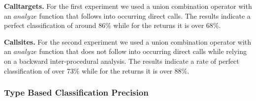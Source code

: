 \textbf{Calltargets.} For the first experiment we used a union combination operator with an $analyze$ function that follows into occurring direct calls.
The results indicate a perfect classification of around 86\% while for the returns it is over 68\%.

\textbf{Callsites.} For the second experiment we used a union combination operator with an $analyze$ function that does not follow into occurring direct calls while relying on a backward inter-procedural analysis.
The results indicate a rate of perfect classification of over 73\% while for the returns it is over 88\%.

\subsubsection{Type Based Classification Precision}
\label{subsection:typeshieldcountprecision}

\texttt{}

